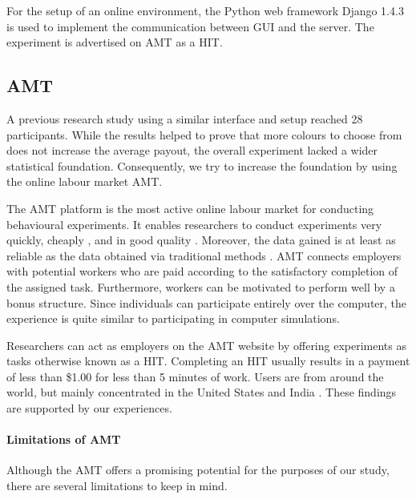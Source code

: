 For the setup of an online environment, the Python web framework Django 1.4.3 is used to implement the communication between \ac{GUI} and the server.
The experiment is advertised on \acf{AMT} as a \ac{HIT}.

\subsection{\acl{AMT}}
\label{ch:Experiment:sec:OnlineImplementation:subsec:AMT}
A previous research study \citep{Schmidt2012} using a similar interface and setup reached 28 participants. While the results helped to prove that more colours to choose from does not increase the average payout, the overall experiment lacked a wider statistical foundation.
Consequently, we try to increase the foundation by using the online labour market \acf{AMT}.

The \ac{AMT} platform is the most active online labour market for conducting behavioural experiments. It enables researchers to conduct experiments very quickly, cheaply \citep{Rand2012}, and in good quality \citep{Gardner2012}. Moreover, the data gained is at least as reliable as the data obtained via traditional methods \citep{Buhrmester2011}. \ac{AMT} connects employers with potential workers who are paid according to the satisfactory completion of the assigned task. Furthermore, workers can be motivated to perform well by a bonus structure. Since individuals can participate entirely over the computer, the experience is quite similar to participating in computer simulations.

Researchers can act as employers on the \ac{AMT} website by offering experiments as tasks otherwise known as a \acf{HIT}. Completing an \ac{HIT} usually results in a payment of less than \$1.00 for less than 5 minutes of work. Users are from around the world, but mainly concentrated in the United States and India \citep{Rand2012}. These findings are supported by our experiences.

\paragraph{Limitations of \acl{AMT}}
Although the \ac{AMT} offers a promising potential for the purposes of our study, there are several limitations to keep in mind.

